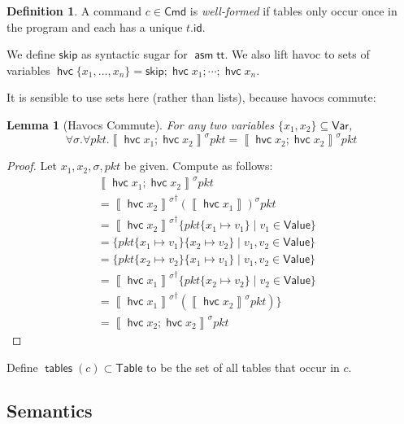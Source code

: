 \documentclass{article}
\newcommand{\pkt}{\mathit{pkt}}
\newcommand{\denote}[1]{\left\llbracket#1\right\rrbracket}
\newcommand{\TRUE}{\mathsf{tt}}
\newcommand{\Value}{\mathsf{Value}}
\newcommand{\Cmd}{\mathsf{Cmd}}
\newcommand{\Table}{\mathsf{Table}}
\newcommand{\Var}{\mathsf{Var}}
\newcommand{\id}{\mathsf{id}}
\newcommand{\assume}{\mathop{\mathsf{asm}}}
\newcommand{\havoc}[1]{\mathop{\mathsf{hvc}}#1}
\newcommand{\SKIP}{\mathsf{skip}}
\newcommand{\tables}{\mathop{\mathsf{tables}}}
\theoremstyle{plain}
\newtheorem{lemma}{Lemma}
\theoremstyle{definition}
\newtheorem{definition}{Definition}
\theoremstyle{remark}
\begin{document}
\begin{definition}
  \label{def:well-formed-command}
   A command $c \in \Cmd$ is \emph{well-formed} if tables only occur once in the
   program and each has a unique $t.\id$.
\end{definition}

We define $\SKIP$ as syntactic sugar for $\assume \TRUE$. We also lift havoc to
sets of variables $\havoc \{x_1,\ldots,x_n\} = \SKIP; \havoc{x_1}; \cdots; \havoc{x_n}$.


It is sensible to use sets here (rather than lists), because havocs commute:

\begin{lemma}[Havocs Commute]
  For any two variables $\{x_1,x_2\} \subseteq \Var$,
  \[\forall \sigma.\forall \pkt. \denote{\havoc{x_1};\havoc{x_2}}^\sigma\pkt = \denote{\havoc{x_2};\havoc{x_2}}^\sigma\pkt \]
\end{lemma}

\begin{proof}
  Let $x_1, x_2,\sigma,\pkt$ be given.
  Compute as follows:
  \[
  \begin{array}{ll}
    \denote{\havoc{x_1};\havoc{x_2}}^\sigma\pkt\\
    = {\denote{\havoc{x_2}}^\sigma}^\dagger\left(\denote{\havoc{x_1}}\right)^\sigma\pkt
    & \\
    = {\denote{\havoc{x_2}}^\sigma}^\dagger\{\pkt\{x_1 \mapsto v_1\} \mid v_1 \in \Value\}
    & \\
    = \{\pkt\{x_1 \mapsto v_1\}\{x_2 \mapsto v_2\} \mid v_1,v_2 \in \Value\}
    & \\
    = \{\pkt\{x_2 \mapsto v_2\}\{x_1 \mapsto v_1\} \mid v_1,v_2 \in \Value\}
    & \\
    = {\denote{\havoc{x_1}}^\sigma}^\dagger\{\pkt\{x_2 \mapsto v_2\} \mid v_2 \in \Value\}
    & \\
    = {\denote{\havoc{x_1}}^\sigma}^\dagger\left(\denote{\havoc{x_2}}^\sigma\pkt\right)\}
    & \\
    = \denote{\havoc{x_2};\havoc{x_2}}^\sigma\pkt
  \end{array}
  \]
\end{proof}

Define $\tables(c) \subset \Table$ to be the set of all tables that occur in $c$.

\subsection{Semantics}
\end{document}
